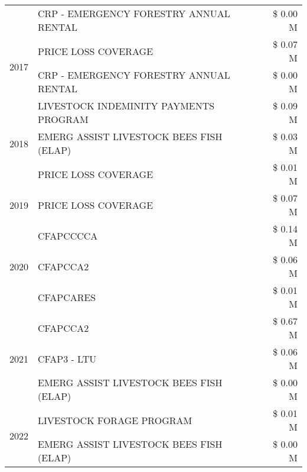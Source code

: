 \begin{tabular}{llr}
 & CRP - EMERGENCY FORESTRY ANNUAL RENTAL & \$ 0.00 M \\
\cline{1-3}
\multirow[t]{2}{*}{2017} & PRICE LOSS COVERAGE & \$ 0.07 M \\
 & CRP - EMERGENCY FORESTRY ANNUAL RENTAL & \$ 0.00 M \\
\cline{1-3}
\multirow[t]{3}{*}{2018} & LIVESTOCK INDEMINITY PAYMENTS PROGRAM & \$ 0.09 M \\
 & EMERG ASSIST LIVESTOCK BEES FISH (ELAP) & \$ 0.03 M \\
 & PRICE LOSS COVERAGE & \$ 0.01 M \\
\cline{1-3}
2019 & PRICE LOSS COVERAGE & \$ 0.07 M \\
\cline{1-3}
\multirow[t]{3}{*}{2020} & CFAPCCCCA & \$ 0.14 M \\
 & CFAPCCA2 & \$ 0.06 M \\
 & CFAPCARES & \$ 0.01 M \\
\cline{1-3}
\multirow[t]{3}{*}{2021} & CFAPCCA2 & \$ 0.67 M \\
 & CFAP3 - LTU & \$ 0.06 M \\
 & EMERG ASSIST LIVESTOCK BEES FISH (ELAP) & \$ 0.00 M \\
\cline{1-3}
\multirow[t]{2}{*}{2022} & LIVESTOCK FORAGE PROGRAM & \$ 0.01 M \\
 & EMERG ASSIST LIVESTOCK BEES FISH (ELAP) & \$ 0.00 M \\
\cline{1-3}
\bottomrule
\end{tabular}
